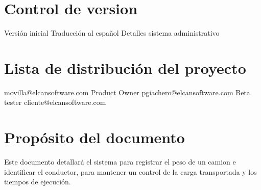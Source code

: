 \section{Control de version}
\begin{elcanversions}
	 {Versión inicial}
	 {Traducción al español}
	 {Detalles sistema administrativo}
\end{elcanversions}

\section{Lista de distribución del proyecto}

\begin{elcandistribution}
	 {movilla@elcansoftware.com} {\distribdate} 
	 {Product Owner} {pgiachero@elcansoftware.com} {\distribdate}
	 {Beta tester} {cliente@elcansoftware.com}{\distribdate}
\end{elcandistribution}

\section{Propósito del documento}
Este documento detallar\'a el sistema para registrar el peso de un camion e identificar el conductor, para mantener 
un control de la carga transportada y los tiempos de ejecuci\'on.
